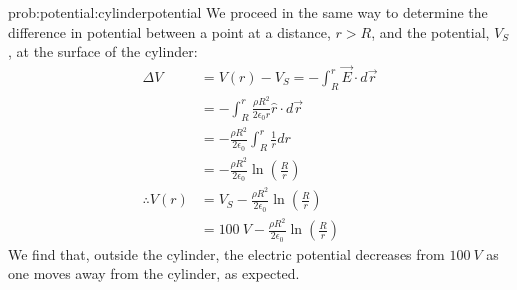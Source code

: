 \begin{solution}{prob:potential:cylinderpotential}
We proceed in the same way to determine the difference in potential between a point at a distance, $r>R$, and the potential, $V_S$, at the surface of the cylinder:
\begin{align*}
\Delta V &=  V(r) - V_S = -\int_{R}^{r} \vec E\cdot d \vec r\\
&= -\int_{R}^{r} \frac{\rho R^2}{2\epsilon_0r} \hat r \cdot d \vec r\\
&= - \frac{\rho R^2}{2\epsilon_0} \int_{R}^{r} \frac{1}{r}dr\\
&=- \frac{\rho R^2}{2\epsilon_0} \ln \left( \frac{R}{r} \right)\\
\therefore V(r) &= V_S - \frac{\rho R^2}{2\epsilon_0} \ln \left( \frac{R}{r} \right)\\
&= \SI{100}{V} - \frac{\rho R^2}{2\epsilon_0} \ln \left( \frac{R}{r} \right)
\end{align*}
We find that, outside the cylinder, the electric potential decreases from $\SI{100}{V}$ as one moves away from the cylinder, as expected.
\end{solution}

